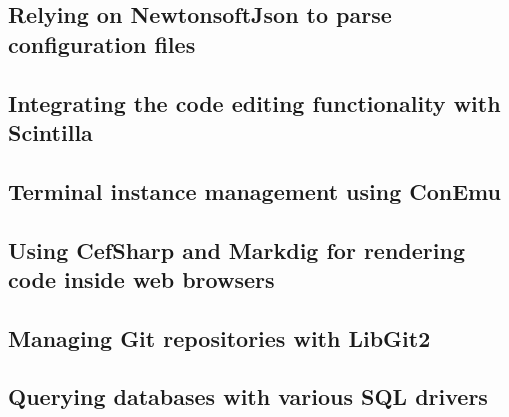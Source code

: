 \subsection{Relying on NewtonsoftJson to parse configuration files}
\subsection{Integrating the code editing functionality with Scintilla}
\subsection{Terminal instance management using ConEmu}
\subsection{Using CefSharp and Markdig for rendering code inside web browsers}
\subsection{Managing Git repositories with LibGit2}
\subsection{Querying databases with various SQL drivers}